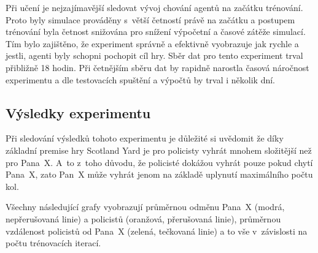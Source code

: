 Při učení je nejzajímavější sledovat vývoj chování agentů na začátku trénování.
Proto byly simulace prováděny s~větší četností právě na začátku a postupem trénování byla četnost snižována pro snížení výpočetní a časové zátěže simulací.
Tím bylo zajištěno, že experiment správně a efektivně vyobrazuje jak rychle a jestli, agenti byly schopni pochopit cíl hry.
Sběr dat pro tento experiment trval přibližně 18 hodin.
Při četnějším sběru dat by rapidně narostla časová náročnost experimentu a dle testovacích spuštění a výpočtů by trval i několik dní.

\subsection{Výsledky experimentu}
\label{subsec:vysledky-experimentu-1}

Při sledování výsledků tohoto experimentu je důležité si uvědomit že díky základní premise hry Scotland Yard je pro policisty vyhrát mnohem složitější než pro Pana~X\@.
A~to z~toho důvodu, že  policisté dokážou vyhrát pouze pokud chytí Pana~X, zato Pan~X může vyhrát jenom na základě uplynutí maximálního počtu kol.

Všechny následující grafy vyobrazují průměrnou odměnu Pana~X (modrá, nepřerušovaná linie) a policistů (oranžová, přerušovaná linie), průměrnou vzdálenost policistů od Pana~X (zelená, tečkovaná linie) a to vše v~závislosti na počtu trénovacích iterací.

